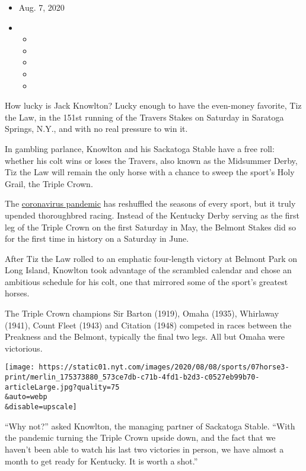 \begin{itemize}
\item
  Aug. 7, 2020
\item
  \begin{itemize}
  \item
  \item
  \item
  \item
  \item
  \end{itemize}
\end{itemize}

How lucky is Jack Knowlton? Lucky enough to have the even-money
favorite, Tiz the Law, in the 151st running of the Travers Stakes on
Saturday in Saratoga Springs, N.Y., and with no real pressure to win it.

In gambling parlance, Knowlton and his Sackatoga Stable have a free
roll: whether his colt wins or loses the Travers, also known as the
Midsummer Derby, Tiz the Law will remain the only horse with a chance to
sweep the sport's Holy Grail, the Triple Crown.

The \href{https://www.nytimes.com/news-event/coronavirus}{coronavirus
pandemic} has reshuffled the seasons of every sport, but it truly
upended thoroughbred racing. Instead of the Kentucky Derby serving as
the first leg of the Triple Crown on the first Saturday in May, the
Belmont Stakes did so for the first time in history on a Saturday in
June.

After Tiz the Law rolled to an emphatic four-length victory at Belmont
Park on Long Island, Knowlton took advantage of the scrambled calendar
and chose an ambitious schedule for his colt, one that mirrored some of
the sport's greatest horses.

The Triple Crown champions Sir Barton (1919), Omaha (1935), Whirlaway
(1941), Count Fleet (1943) and Citation (1948) competed in races between
the Preakness and the Belmont, typically the final two legs. All but
Omaha were victorious.

\texttt{[image: https://static01.nyt.com/images/2020/08/08/sports/07horse3-print/merlin\_175373880\_573ce7db-c71b-4fd1-b2d3-c0527eb99b70-articleLarge.jpg?quality=75\\\&auto=webp\\\&disable=upscale]}

``Why not?'' asked Knowlton, the managing partner of Sackatoga Stable.
``With the pandemic turning the Triple Crown upside down, and the fact
that we haven't been able to watch his last two victories in person, we
have almost a month to get ready for Kentucky. It is worth a shot.''

